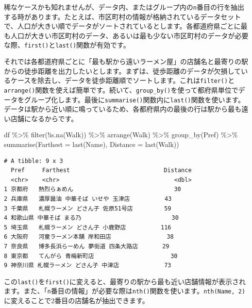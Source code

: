 \documentclass[
  a4paper,
  pandoc,
  ja=standard,
  jafont=haranoaji]{bxjsbook}
\newenvironment{Shaded}{\begin{snugshade}}{\end{snugshade}}
\newcommand{\AttributeTok}[1]{\textcolor[rgb]{0.00,0.48,0.65}{#1}}
\newcommand{\FunctionTok}[1]{\textcolor[rgb]{0.28,0.35,0.67}{#1}}
\newcommand{\NormalTok}[1]{\textcolor[rgb]{0.00,0.48,0.65}{#1}}
\newcommand{\SpecialCharTok}[1]{\textcolor[rgb]{0.37,0.37,0.37}{#1}}
\begin{document}
稀なケースかも知れませんが、データ内、またはグループ内の\texttt{n}番目の行を抽出する時があります。たとえば、市区町村の情報が格納されているデータセットで、人口が大きい順でデータがソートされているとします。各都道府県ごとに最も人口が大きい市区町村のデータ、あるいは最も少ない市区町村のデータが必要な際、\texttt{first()}と\texttt{last()}関数が有効です。

それでは各都道府県ごとに「最も駅から遠いラーメン屋」の店舗名と最寄りの駅からの徒歩距離を出力したいとします。まずは、徒歩距離のデータが欠損しているケースを除去し、データを徒歩距離順でソートします。これは\texttt{filter()}と\texttt{arrange()}関数を使えば簡単です。続いて、\texttt{group\_by()}を使って都府県単位でデータをグループ化します。最後に\texttt{summarise()}関数内に\texttt{last()}関数を使います。データは駅から近い順に鳴っているため、各都府県内の最後の行は駅から最も遠い店舗になるからです。

\begin{Shaded}
\begin{Highlighting}[numbers=left,,]
\NormalTok{df }\SpecialCharTok{\%\textgreater{}\%}
  \FunctionTok{filter}\NormalTok{(}\SpecialCharTok{!}\FunctionTok{is.na}\NormalTok{(Walk)) }\SpecialCharTok{\%\textgreater{}\%}
  \FunctionTok{arrange}\NormalTok{(Walk) }\SpecialCharTok{\%\textgreater{}\%}
  \FunctionTok{group\_by}\NormalTok{(Pref) }\SpecialCharTok{\%\textgreater{}\%}
  \FunctionTok{summarise}\NormalTok{(}\AttributeTok{Farthest  =} \FunctionTok{last}\NormalTok{(Name),}
            \AttributeTok{Distance  =} \FunctionTok{last}\NormalTok{(Walk))}
\end{Highlighting}
\end{Shaded}

\begin{verbatim}
# A tibble: 9 x 3
  Pref     Farthest                           Distance
  <chr>    <chr>                                 <dbl>
1 京都府   熱烈らぁめん                             30
2 兵庫県   濃厚醤油 中華そば いせや 玉津店          43
3 千葉県   札幌ラーメン どさん子 佐原51号店         59
4 和歌山県 中華そば まる乃                          30
5 埼玉県   札幌ラーメン どさん子 小鹿野店          116
6 大阪府   河童ラーメン本舗 岸和田店                38
7 奈良県   博多長浜らーめん 夢街道 四条大路店       29
8 東京都   てんがら 青梅新町店                      30
9 神奈川県 札幌ラーメン どさん子 中津店             73
\end{verbatim}

この\texttt{last()}を\texttt{first()}に変えると、最寄りの駅から最も近い店舗情報が表示されます。また、「\texttt{n}番目の情報」が必要な際は\texttt{nth()}関数を使います。\texttt{nth(Name,\ 2)}に変えることで2番目の店舗名が抽出できます。
\end{document}
